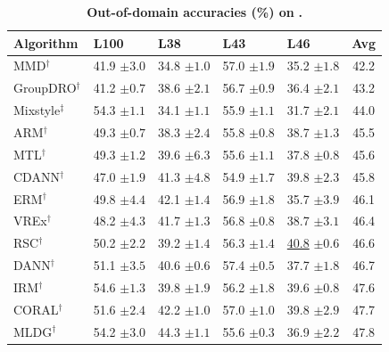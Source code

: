 \begin{table}[htbp]
\centering
\small
\renewcommand{\arraystretch}{1.1}
\caption{\textbf{Out-of-domain accuracies (\%) on} \textbf{.}}
\begin{tabular}{lllll|c}
\toprule
\textbf{Algorithm} & \textbf{L100} & \textbf{L38} & \textbf{L43} & \textbf{L46} & \textbf{Avg} \\
\midrule
MMD$^\dagger$ & 41.9 \scriptsize$\pm3.0$ & 34.8 \scriptsize$\pm1.0$ & 57.0 \scriptsize$\pm1.9$ & 35.2 \scriptsize$\pm1.8$ & 42.2 \\
GroupDRO$^\dagger$ & 41.2 \scriptsize$\pm0.7$ & 38.6 \scriptsize$\pm2.1$ & 56.7 \scriptsize$\pm0.9$ & 36.4 \scriptsize$\pm2.1$ & 43.2 \\
Mixstyle$^\ddagger$ & 54.3 \scriptsize$\pm1.1$ & 34.1 \scriptsize$\pm1.1$ & 55.9 \scriptsize$\pm1.1$ & 31.7 \scriptsize$\pm2.1$ & 44.0 \\
ARM$^\dagger$ & 49.3 \scriptsize$\pm0.7$ & 38.3 \scriptsize$\pm2.4$ & 55.8 \scriptsize$\pm0.8$ & 38.7 \scriptsize$\pm1.3$ & 45.5 \\
MTL$^\dagger$ & 49.3 \scriptsize$\pm1.2$ & 39.6 \scriptsize$\pm6.3$ & 55.6 \scriptsize$\pm1.1$ & 37.8 \scriptsize$\pm0.8$ & 45.6 \\
CDANN$^\dagger$ & 47.0 \scriptsize$\pm1.9$ & 41.3 \scriptsize$\pm4.8$ & 54.9 \scriptsize$\pm1.7$ & 39.8 \scriptsize$\pm2.3$ & 45.8 \\
ERM$^\dagger$ & 49.8 \scriptsize$\pm4.4$ & 42.1 \scriptsize$\pm1.4$ & 56.9 \scriptsize$\pm1.8$ & 35.7 \scriptsize$\pm3.9$ & 46.1 \\
VREx$^\dagger$ & 48.2 \scriptsize$\pm4.3$ & 41.7 \scriptsize$\pm1.3$ & 56.8 \scriptsize$\pm0.8$ & 38.7 \scriptsize$\pm3.1$ & 46.4 \\
RSC$^\dagger$ & 50.2 \scriptsize$\pm2.2$ & 39.2 \scriptsize$\pm1.4$ & 56.3 \scriptsize$\pm1.4$ & \underline{40.8} \scriptsize$\pm0.6$ & 46.6 \\
DANN$^\dagger$ & 51.1 \scriptsize$\pm3.5$ & 40.6 \scriptsize$\pm0.6$ & 57.4 \scriptsize$\pm0.5$ & 37.7 \scriptsize$\pm1.8$ & 46.7 \\
IRM$^\dagger$ & 54.6 \scriptsize$\pm1.3$ & 39.8 \scriptsize$\pm1.9$ & 56.2 \scriptsize$\pm1.8$ & 39.6 \scriptsize$\pm0.8$ & 47.6 \\
CORAL$^\dagger$ & 51.6 \scriptsize$\pm2.4$ & 42.2 \scriptsize$\pm1.0$ & 57.0 \scriptsize$\pm1.0$ & 39.8 \scriptsize$\pm2.9$ & 47.7 \\
MLDG$^\dagger$ & 54.2 \scriptsize$\pm3.0$ & 44.3 \scriptsize$\pm1.1$ & 55.6 \scriptsize$\pm0.3$ & 36.9 \scriptsize$\pm2.2$ & 47.8 \\

\end{tabular}
\end{table}

